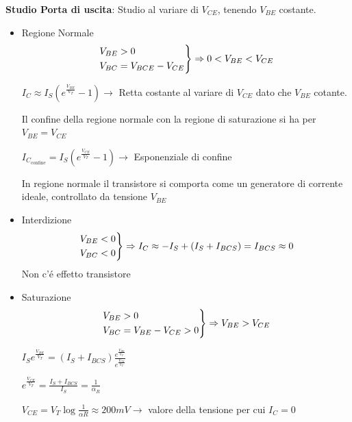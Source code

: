 \documentclass{article}
\begin{document}
\textbf{Studio Porta di uscita}: Studio al variare di $V_{CE}$, tenendo $V_{BE}$ costante.

\begin{itemize}
    \item Regione Normale
        \[
            \begin{rcases}
                V_{BE} > 0\\
                V_{BC} = V_{BCE} - V_{CE}
            \end{rcases} \Rightarrow 0 < V_{BE} < V_{CE}
        \]

        $I_C \approx I_S \left( e^{\frac{V_{BE}}{V_T}} -1\right) \rightarrow$ Retta costante al variare di $V_{CE}$ dato che $V_{BE}$ cotante.

        Il confine della regione normale con la regione di saturazione si ha per $V_{BE} = V_{CE}$

        $I_{C_{\text{confine}}} = I_S \left( e^{\frac{V_{CE}}{V_T}} -1\right) \rightarrow$ Esponenziale di confine


        In regione normale il transistore si comporta come un generatore di corrente ideale, controllato da tensione $V_{BE}$

    \item Interdizione
        \[
            \begin{rcases}
                V_{BE} < 0\\
                V_{BC} < 0
            \end{rcases} \Rightarrow I_C \approx -I_S + (I_S + I_{BCS}) = I_{BCS} \approx 0
        \]
        Non c'\'e effetto transistore

    \item Saturazione
        \[
            \begin{rcases}
                V_{BE} > 0\\
                V_{BC} = V_{BE} - V_{CE} > 0
            \end{rcases}\Rightarrow V_{BE} > V_{CE}
        \]

        $I_S e^{\frac{V_{BE}}{V_T}} = (I_S + I_{BCS})\frac{e^{\frac{V_{BE}}{V_T}}}{e^\frac{V_{CE}}{V_T}}$

        $e^{\frac{V_{CE}}{V_T}} = \frac{I_S + I_{BCS}}{I_S} = \frac{1}{\alpha_R}$

        $V_{CE} = V_T \log\frac{1}{\alpha R} \approx 200 mV \rightarrow$ valore della tensione per cui $I_C = 0$

\end{itemize}
\end{document}
